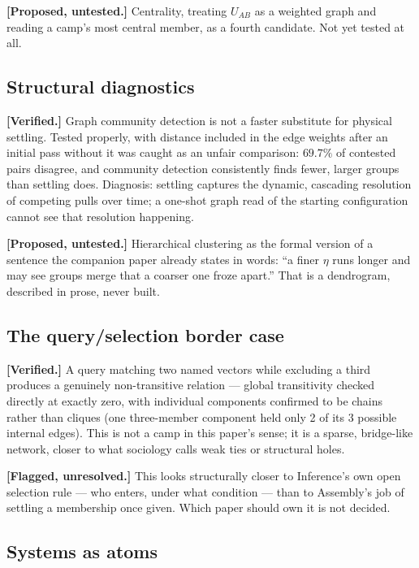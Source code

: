 \documentclass[12pt, a4paper]{article}
\begin{document}
\textbf{[Proposed, untested.]} Centrality, treating $U_{AB}$ as a
weighted graph and reading a camp's most central member, as a fourth
candidate. Not yet tested at all.

\subsection*{Structural diagnostics}

\textbf{[Verified.]} Graph community detection is not a faster
substitute for physical settling. Tested properly, with distance
included in the edge weights after an initial pass without it was
caught as an unfair comparison: $69.7\%$ of contested pairs disagree,
and community detection consistently finds fewer, larger groups than
settling does. Diagnosis: settling captures the dynamic, cascading
resolution of competing pulls over time; a one-shot graph read of
the starting configuration cannot see that resolution happening.

\textbf{[Proposed, untested.]} Hierarchical clustering as the formal
version of a sentence the companion paper already states in words:
``a finer $\eta$ runs longer and may see groups merge that a coarser
one froze apart.'' That is a dendrogram, described in prose, never
built.

\subsection*{The query/selection border case}

\textbf{[Verified.]} A query matching two named vectors while
excluding a third produces a genuinely non-transitive relation ---
global transitivity checked directly at exactly zero, with individual
components confirmed to be chains rather than cliques (one
three-member component held only 2 of its 3 possible internal edges).
This is not a camp in this paper's sense; it is a sparse,
bridge-like network, closer to what sociology calls weak ties or
structural holes.

\textbf{[Flagged, unresolved.]} This looks structurally closer to
Inference's own open selection rule --- who enters, under what
condition --- than to Assembly's job of settling a membership once
given. Which paper should own it is not decided.

\subsection*{Systems as atoms}
\end{document}
